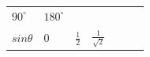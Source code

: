 {\begin{tabular}[t]{|l|l|l|l|l|l|l|}
        
                  \begin{math}{90}^{\circ }\end{math}
                 &
    
    
        
                  \begin{math}{180}^{\circ }\end{math}
     \tabularnewline\cline{1-1}\cline{2-2}\cline{3-3}\cline{4-4}\cline{5-5}\cline{6-6}\cline{7-7}
    
    
        
                  \begin{math}sin\theta \end{math}
                 &
    
    
        0 &
    
    
        
                  \begin{math}\frac{1}{2}\end{math}
                 &
    
    
        
                  \begin{math}\frac{1}{\sqrt{2}}\end{math}
                 &
    

\end{tabular}}
